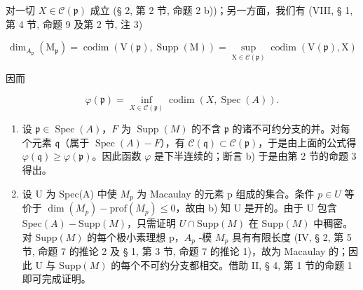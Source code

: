对一切 \(X \in \mathcal{C}(\mathfrak{p})\) 成立 (§ 2, 第 2 节, 命题 2 b))；另一方面，我们有 (VIII, § 1, 第 4 节, 命题 9 及第 2 节, 注 3)

\[
\dim_ {A_ {\mathfrak {p}}} \left(\mathrm{M} _ {\mathfrak {p}}\right) = \operatorname{codim} (\mathrm{V} (\mathfrak {p}), \operatorname{Supp} (\mathrm{M})) = \sup _ {\mathrm{X} \in \mathscr {C} (\mathfrak {p})} \operatorname{codim} (\mathrm{V} (\mathfrak {p}), \mathrm{X})
\]

因而

\[
\varphi (\mathfrak {p}) = \inf _ {X \in \mathscr {C} (\mathfrak {p})} \operatorname{codim} (X, \operatorname{Spec} (A)).
\]

\begin{enumerate}
\def\labelenumi{\alph{enumi})}
\setcounter{enumi}{1}
\item
  设 \(\mathfrak{p} \in \operatorname{Spec}(A)\)，\(F\) 为 \(\operatorname{Supp}(M)\) 的不含 \(\mathfrak{p}\) 的诸不可约分支的并。对每个元素 \(\mathfrak{q}\)（属于 \(\operatorname{Spec}(A) - F\)），有 \(\mathcal{C}(\mathfrak{q}) \subset \mathcal{C}(\mathfrak{p})\)，于是由上面的公式得 \(\varphi(\mathfrak{q}) \geqslant \varphi(\mathfrak{p})\)。因此函数 \(\varphi\) 是下半连续的；断言 b) 于是由第 2 节的命题 3 得出。
\item
  设 U 为 Spec(A) 中使 \(M_{p}\) 为 Macaulay 的元素 p 组成的集合。条件 \(p \in U\) 等价于 \(\dim(M_{p}) - \text{prof}(M_{p}) \leqslant 0\)，故由 b) 知 U 是开的。由于 U 包含 \(\text{Spec}(A) - \text{Supp}(M)\)，只需证明 \(U \cap \text{Supp}(M)\) 在 \(\text{Supp}(M)\) 中稠密。对 \(\text{Supp}(M)\) 的每个极小素理想 p，\(A_{p}\) -模 \(M_{p}\) 具有有限长度 (IV, § 2, 第 5 节, 命题 7 的推论 2 及 § 1, 第 3 节, 命题 7 的推论 1)，故为 Macaulay 的；因此 U 与 \(\text{Supp}(M)\) 的每个不可约分支都相交。借助 II, § 4, 第 1 节的命题 1 即可完成证明。
\end{enumerate}

